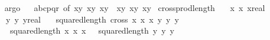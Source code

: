 \begin{isabellebody}
\isadelimproof
\ %
\endisadelimproof
%
\isatagproof
{}\isamarkupfalse%
\ argo%
\endisatagproof
{\isafoldproof}%
%
\isadelimproof
%
\endisadelimproof
\ \isanewline
\isanewline
{}\isamarkupfalse%
\ abcpqr\ {\isacharbrackleft}{\kern0pt}of\ {\isachardoublequoteopen}x{}{\isacharasterisk}{\kern0pt}y{}{\isachardoublequoteclose}\ {\isachardoublequoteopen}x{}{\isacharasterisk}{\kern0pt}y{}{\isachardoublequoteclose}\ {\isachardoublequoteopen}x{}{\isacharasterisk}{\kern0pt}y{}{\isachardoublequoteclose}\ \ {\isachardoublequoteopen}x{}{\isacharasterisk}{\kern0pt}y{}{\isachardoublequoteclose}\ {\isachardoublequoteopen}x{}{\isacharasterisk}{\kern0pt}y{}{\isachardoublequoteclose}\ {\isachardoublequoteopen}x{}{\isacharasterisk}{\kern0pt}y{}{\isachardoublequoteclose}{\isacharbrackright}{\kern0pt}\isanewline
\isanewline
{}\isamarkupfalse%
\ cross{\isacharunderscore}{\kern0pt}prod{\isacharunderscore}{\kern0pt}length{\isacharcolon}{\kern0pt}\isanewline
\ \ \ x{}\ x{}\ x{}{\isacharcolon}{\kern0pt}{\isacharcolon}{\kern0pt}real\isanewline
\ \ \ y{}\ y{}\ y{}{\isacharcolon}{\kern0pt}{\isacharcolon}{\kern0pt}real\isanewline
\ \ \ {\isachardoublequoteopen}squared{\isacharunderscore}{\kern0pt}length\ {\isacharparenleft}{\kern0pt}cross\ {\isacharparenleft}{\kern0pt}x{}{\isacharcomma}{\kern0pt}\ x{}{\isacharcomma}{\kern0pt}\ x{}{\isacharparenright}{\kern0pt}\ {\isacharparenleft}{\kern0pt}y{}{\isacharcomma}{\kern0pt}\ y{}{\isacharcomma}{\kern0pt}\ y{}{\isacharparenright}{\kern0pt}{\isacharparenright}{\kern0pt}\ {\isacharequal}{\kern0pt}\ \isanewline
\ \ \ \ {\isacharparenleft}{\kern0pt}squared{\isacharunderscore}{\kern0pt}length\ {\isacharparenleft}{\kern0pt}x{}{\isacharcomma}{\kern0pt}\ x{}{\isacharcomma}{\kern0pt}\ x{}{\isacharparenright}{\kern0pt}\ {\isacharparenright}{\kern0pt}\ {\isacharasterisk}{\kern0pt}\ {\isacharparenleft}{\kern0pt}squared{\isacharunderscore}{\kern0pt}length\ {\isacharparenleft}{\kern0pt}y{}{\isacharcomma}{\kern0pt}\ y{}{\isacharcomma}{\kern0pt}\ y{}{\isacharparenright}{\kern0pt}\ {\isacharparenright}{\kern0pt}\ {\isacharminus}{\kern0pt}\ \isanewline

\end{isabellebody}
